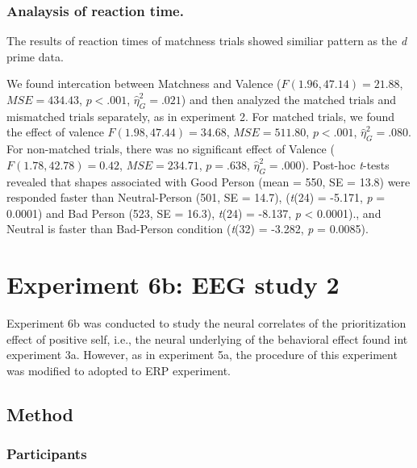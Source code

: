\documentclass[man]{apa6}
\begin{document}
\hypertarget{analaysis-of-reaction-time.-5}{%
\subsubsection{Analaysis of reaction time.}\label{analaysis-of-reaction-time.-5}}

The results of reaction times of matchness trials showed similiar pattern as the \emph{d} prime data.

We found intercation between Matchness and Valence (\(F(1.96, 47.14) = 21.88\), \(\mathit{MSE} = 434.43\), \(p < .001\), \(\hat{\eta}^2_G = .021\)) and then analyzed the matched trials and mismatched trials separately, as in experiment 2. For matched trials, we found the effect of valence \(F(1.98, 47.44) = 34.68\), \(\mathit{MSE} = 511.80\), \(p < .001\), \(\hat{\eta}^2_G = .080\). For non-matched trials, there was no significant effect of Valence (\(F(1.78, 42.78) = 0.42\), \(\mathit{MSE} = 234.71\), \(p = .638\), \(\hat{\eta}^2_G = .000\)). Post-hoc \emph{t}-tests revealed that shapes associated with Good Person (mean = 550, SE = 13.8) were responded faster than Neutral-Person (501, SE = 14.7), (\emph{t}(24) = -5.171, \emph{p} = 0.0001) and Bad Person (523, SE = 16.3), \emph{t}(24) = -8.137, \emph{p} \textless{} 0.0001)., and Neutral is faster than Bad-Person condition (\emph{t}(32) = -3.282, \emph{p} = 0.0085).

\hypertarget{experiment-6b-eeg-study-2}{%
\section{Experiment 6b: EEG study 2}\label{experiment-6b-eeg-study-2}}

Experiment 6b was conducted to study the neural correlates of the prioritization effect of positive self, i.e., the neural underlying of the behavioral effect found int experiment 3a. However, as in experiment 5a, the procedure of this experiment was modified to adopted to ERP experiment.

\hypertarget{method-8}{%
\subsection{Method}\label{method-8}}

\hypertarget{participants-10}{%
\subsubsection{Participants}\label{participants-10}}
\end{document}
